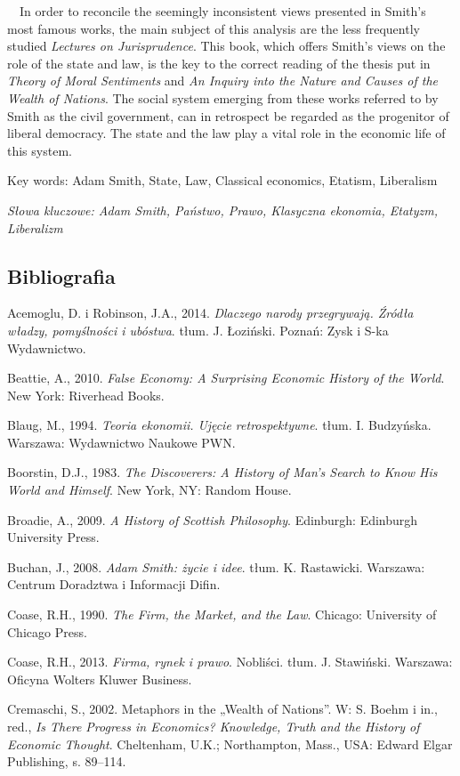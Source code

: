 \documentclass[a4paper]{article}
\begin{document}
 \ \ In order to reconcile the seemingly inconsistent views presented in Smith's most famous works, the main subject of this analysis are the less frequently studied \textit{Lectures on Jurisprudence}. This book, which offers Smith's views on the role of the state and law, is the key to the correct reading of the thesis put in \textit{Theory of Moral Sentiments} and \textit{An Inquiry into the Nature and Causes of the Wealth of Nations}. The social system emerging from these works referred to by Smith as the civil government, can in retrospect be regarded as the progenitor of liberal democracy. The state and the law play a vital role in the economic life of this system.

Key words: Adam Smith, State, Law, Classical economics, Etatism, Liberalism 

{\itshape
Słowa kluczowe: Adam Smith, Państwo, Prawo, Klasyczna ekonomia, Etatyzm, Liberalizm}

\subsection{Bibliografia}
Acemoglu, D. i Robinson, J.A., 2014. \textit{Dlaczego narody przegrywają. Źródła władzy, pomyślności i ubóstwa}. tłum. J. Łoziński. Poznań: Zysk i S-ka Wydawnictwo.

Beattie, A., 2010. \textit{False Economy: A Surprising Economic History of the World}. New York: Riverhead Books.

Blaug, M., 1994. \textit{Teoria ekonomii. Ujęcie retrospektywne}. tłum. I. Budzyńska. Warszawa: Wydawnictwo Naukowe PWN.

Boorstin, D.J., 1983. \textit{The Discoverers: A History of Man’s Search to Know His World and Himself}. New York, NY: Random House.

Broadie, A., 2009. \textit{A History of Scottish Philosophy}. Edinburgh: Edinburgh University Press.

Buchan, J., 2008. \textit{Adam Smith: życie i idee}. tłum. K. Rastawicki. Warszawa: Centrum Doradztwa i Informacji Difin.

Coase, R.H., 1990. \textit{The Firm, the Market, and the Law}. Chicago: University of Chicago Press.

Coase, R.H., 2013. \textit{Firma, rynek i prawo}. Nobliści. tłum. J. Stawiński. Warszawa: Oficyna Wolters Kluwer Business.

Cremaschi, S., 2002. Metaphors in the „Wealth of Nations”. W: S. Boehm i in., red., \textit{Is There Progress in Economics? Knowledge, Truth and the History of Economic Thought}. Cheltenham, U.K.; Northampton, Mass., USA: Edward Elgar Publishing, s. 89–114.
\end{document}
